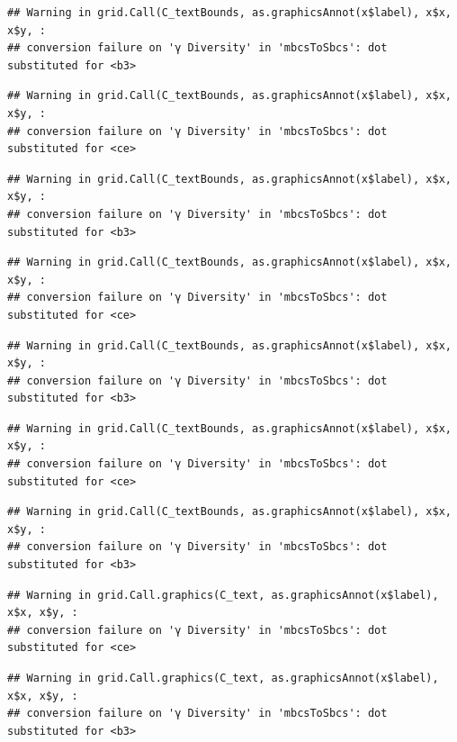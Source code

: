 \documentclass[
]{article}
\begin{document}
\begin{verbatim}
## Warning in grid.Call(C_textBounds, as.graphicsAnnot(x$label), x$x, x$y, :
## conversion failure on 'γ Diversity' in 'mbcsToSbcs': dot substituted for <b3>
\end{verbatim}

\begin{verbatim}
## Warning in grid.Call(C_textBounds, as.graphicsAnnot(x$label), x$x, x$y, :
## conversion failure on 'γ Diversity' in 'mbcsToSbcs': dot substituted for <ce>
\end{verbatim}

\begin{verbatim}
## Warning in grid.Call(C_textBounds, as.graphicsAnnot(x$label), x$x, x$y, :
## conversion failure on 'γ Diversity' in 'mbcsToSbcs': dot substituted for <b3>
\end{verbatim}

\begin{verbatim}
## Warning in grid.Call(C_textBounds, as.graphicsAnnot(x$label), x$x, x$y, :
## conversion failure on 'γ Diversity' in 'mbcsToSbcs': dot substituted for <ce>
\end{verbatim}

\begin{verbatim}
## Warning in grid.Call(C_textBounds, as.graphicsAnnot(x$label), x$x, x$y, :
## conversion failure on 'γ Diversity' in 'mbcsToSbcs': dot substituted for <b3>
\end{verbatim}

\begin{verbatim}
## Warning in grid.Call(C_textBounds, as.graphicsAnnot(x$label), x$x, x$y, :
## conversion failure on 'γ Diversity' in 'mbcsToSbcs': dot substituted for <ce>
\end{verbatim}

\begin{verbatim}
## Warning in grid.Call(C_textBounds, as.graphicsAnnot(x$label), x$x, x$y, :
## conversion failure on 'γ Diversity' in 'mbcsToSbcs': dot substituted for <b3>
\end{verbatim}

\begin{verbatim}
## Warning in grid.Call.graphics(C_text, as.graphicsAnnot(x$label), x$x, x$y, :
## conversion failure on 'γ Diversity' in 'mbcsToSbcs': dot substituted for <ce>
\end{verbatim}

\begin{verbatim}
## Warning in grid.Call.graphics(C_text, as.graphicsAnnot(x$label), x$x, x$y, :
## conversion failure on 'γ Diversity' in 'mbcsToSbcs': dot substituted for <b3>
\end{verbatim}
\end{document}
